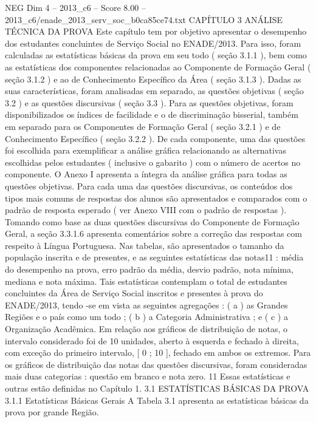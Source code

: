 \begin{textsample}{NEG Dim 4 – 2013\_c6 – Score 8.00 – 2013\_c6/enade\_2013\_serv\_soc\_b0ca85ce74.txt}  \label{ex:f4_neg_316}
CAPÍTULO 3 ANÁLISE TÉCNICA DA PROVA Este capítulo tem por objetivo apresentar o desempenho dos estudantes concluintes de Serviço Social no ENADE/2013.
Para isso, foram calculadas as estatísticas básicas da prova em seu todo ( seção 3.1.1 ), bem como as estatísticas dos componentes relacionadas ao Componente de Formação Geral ( seção 3.1.2 ) e ao de Conhecimento Específico da Área ( seção 3.1.3 ).
Dadas as suas características, foram analisadas em separado, as questões objetivas ( seção 3.2 ) e as questões discursivas ( seção 3.3 ).
Para as questões objetivas, foram disponibilizados os índices de facilidade e o de discriminação bisserial, também em separado para os Componentes de Formação Geral ( seção 3.2.1 ) e de Conhecimento Específico ( seção 3.2.2 ).
De cada componente, uma das questões foi escolhida para exemplificar a análise gráfica relacionando as alternativas escolhidas pelos estudantes ( inclusive o gabarito ) com o número de acertos no componente.
O Anexo I apresenta a íntegra da análise gráfica para todas as questões objetivas.
Para cada uma das questões discursivas, os conteúdos dos tipos mais comuns de respostas dos alunos são apresentados e comparados com o padrão de resposta esperado ( ver Anexo VIII com o padrão de respostas ).
Tomando como base as duas questões discursivas do Componente de Formação Geral, a seção 3.3.1.6 apresenta comentários sobre a correção das respostas com respeito à Língua Portuguesa.
Nas tabelas, são apresentados o tamanho da população inscrita e de presentes, e as seguintes estatísticas das notas11 : média do desempenho na prova, erro padrão da média, desvio padrão, nota mínima, mediana e nota máxima.
Tais estatísticas contemplam o total de estudantes concluintes da Área de Serviço Social inscritos e presentes à prova do ENADE/2013, tendo -se em vista as seguintes agregações : ( a ) as Grandes Regiões e o país como um todo ; ( b ) a Categoria Administrativa ; e ( c ) a Organização Acadêmica.
Em relação aos gráficos de distribuição de notas, o intervalo considerado foi de 10 unidades, aberto à esquerda e fechado à direita, com exceção do primeiro intervalo, [ 0 ; 10 ], fechado em ambos os extremos.
Para os gráficos de distribuição das notas das questões discursivas, foram consideradas mais duas categorias : questão em branco e nota zero. 11 Essas estatísticas e outras estão definidas no Capítulo 1. 3.1 ESTATÍSTICAS BÁSICAS DA PROVA 3.1.1 Estatísticas Básicas Gerais A Tabela 3.1 apresenta as estatísticas básicas da prova por grande Região.

\end{textsample}

